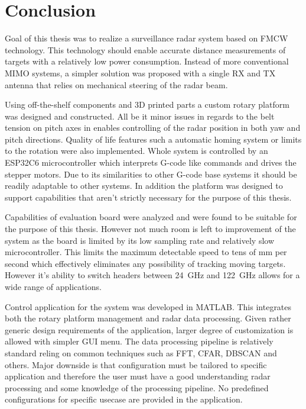 \chapter*{Conclusion}

Goal of this thesis was to realize a surveillance radar system based on FMCW technology.
This technology should enable accurate distance measurements of targets with a relatively low power consumption.
Instead of more conventional MIMO systems, a simpler solution was proposed with a single RX and TX antenna that relies on mechanical steering of the radar beam.

Using off-the-shelf components and 3D printed parts a custom rotary platform was designed and constructed.
All be it minor issues in regards to the belt tension on pitch axes in enables controlling of the radar position in both yaw and pitch directions.
Quality of life features such a automatic homing system or limits to the rotation were also implemented.
Whole system is controlled by an ESP32C6 microcontroller which interprets G-code like commands and drives the stepper motors.
Due to its similarities to other G-code base systems it should be readily adaptable to other systems.
In addition the platform was designed to support capabilities that aren't strictly necessary for the purpose of this thesis.

Capabilities of \sidar evaluation board were analyzed and were found to be suitable for the purpose of this thesis.
However not much room is left to improvement of the system as the board is limited by its low sampling rate and relatively slow microcontroller.
This limits the maximum detectable speed to tens of mm per second which effectively eliminates any possibility of tracking moving targets.
However it's ability to switch headers between 24~GHz and 122~GHz allows for a wide range of applications.

Control application for the system was developed in MATLAB.
This integrates both the rotary platform management and radar data processing.
Given rather generic design requirements of the application, larger degree of customization is allowed with simpler GUI menu.
The data processing pipeline is relatively standard reling on common techniques such as FFT, CFAR, DBSCAN and others.
Major downside is that configuration must be tailored to specific application and therefore the user must have a good understanding radar processing and some knowledge of the processing pipeline.
No predefined configurations for specific usecase are provided in the application.


